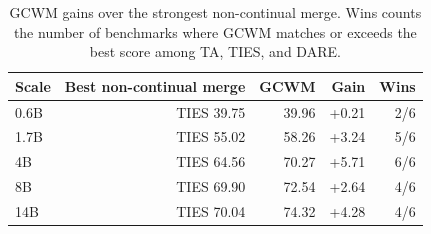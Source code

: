 \documentclass{article}
\begin{document}
\providecommand{\best}[1]{\textbf{#1}}
\providecommand{\ub}[1]{\underline{#1}}

\begin{table}[!htbp]
  \centering
  \caption{
  {GCWM gains over the strongest non-continual merge.}
  Wins counts the number of benchmarks where GCWM matches or exceeds the best score among TA, TIES, and DARE.
  }
  \label{tab:app_normal_merging_gain}
  \small
  \setlength{\tabcolsep}{5pt}
  \renewcommand{\arraystretch}{1.08}
\begin{tabular}{lrrrr}
\toprule[0.9pt]
Scale & Best non-continual merge & GCWM & Gain & Wins \\
\midrule
\rowcolor{rcwmBlue} 0.6B & TIES 39.75 & 39.96 & +0.21 & 2/6 \\
\rowcolor{rcwmBlue} 1.7B & TIES 55.02 & 58.26 & +3.24 & 5/6 \\
\rowcolor{rcwmBlue} 4B & TIES 64.56 & 70.27 & +5.71 & 6/6 \\
\rowcolor{rcwmBlue} 8B & TIES 69.90 & 72.54 & +2.64 & 4/6 \\
\rowcolor{rcwmBlue} 14B & TIES 70.04 & 74.32 & +4.28 & 4/6 \\
\bottomrule[0.9pt]
\end{tabular}

\end{table}
\end{document}

